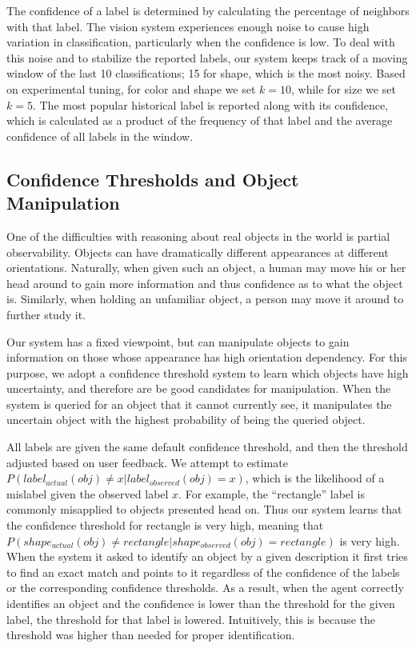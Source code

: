 \documentclass[11pt]{article}
\begin{document}
The confidence of a label is determined by calculating the percentage of
neighbors with that label. The vision system experiences enough noise
to cause high variation in classification, particularly when the
confidence is low. To deal with this noise and to stabilize the reported labels,
our system keeps track of a moving window of the last 10 classifications; 15 for shape, which is
the most noisy. Based on experimental tuning, for color and shape we set $k=10$, while
for size we set $k=5$. The most popular historical label is reported along with its
confidence, which is calculated as a product of the frequency of that label
and the average confidence of all labels in the window.

\subsection{Confidence Thresholds and Object Manipulation}
One of the difficulties with reasoning about real objects in the world is
partial observability. Objects can have dramatically different appearances
at different orientations. Naturally, when given such an object, a human may move
his or her head around to gain more information and thus confidence as to what the object
is.  Similarly, when holding an unfamiliar object, a person may move it around
to further study it.

Our system has a fixed viewpoint, but can
manipulate objects to gain information on those whose appearance has high
orientation dependency. For this purpose, we adopt a confidence threshold system
to learn which objects have high uncertainty, and therefore are
be good candidates for manipulation. When the system is queried for an object
that it cannot currently see, it manipulates the uncertain object with the
highest probability of being the queried object.

All labels are given the same default confidence threshold, and then the
threshold adjusted based on user feedback.
We attempt to estimate $P(label_{actual}(obj) \neq x |
                                       label_{observed}(obj) = x)$,
which is the likelihood of a mislabel given the observed label $x$. For
example, the ``rectangle'' label is commonly misapplied to objects presented
head on. Thus our system learns that the confidence threshold for rectangle is
very high, meaning that $P(shape_{actual}(obj) \neq
                         rectangle|shape_{observed}(obj) = rectangle)$
is very high. When the system it asked to identify an object by a given
description it first tries to find an exact match and points to
it regardless of the confidence of the labels or the
corresponding confidence thresholds. As a result, when the agent
correctly identifies an object and the confidence is lower than the
threshold for the given label, the threshold for that label is lowered.
Intuitively, this is because the threshold was higher than needed for proper
identification.
\end{document}
